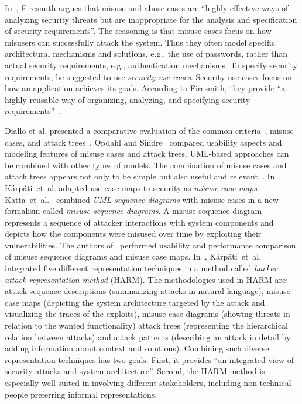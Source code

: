 \documentclass[a4paper]{article}
\begin{document}
In~\cite{Fire}, Firesmith argues that  misuse and abuse cases are ``highly
effective ways of analyzing security threats but are inappropriate for  the
analysis and specification of security requirements''. The reasoning is  that
misuse cases focus on how misusers can successfully attack the system.  Thus
they often model specific architectural mechanisms and solutions, e.g.,  the use
of passwords, rather than actual security requirements, e.g.,  authentication
mechanisms. To specify security requirements, he suggested to  use
\emph{security use cases}. Security use cases focus on how an application 
achieves its goals. According to Firesmith, they provide ``a highly-reusable 
way of organizing, analyzing, and specifying security 
requirements''~\cite{Fire}. 

Diallo et al. presented a comparative  evaluation of the common
criteria~\cite{CC},  misuse cases, and attack  trees~\cite{DiRoSiAlRi}. Opdahl
and Sindre~\cite{OpSi} compared usability aspects and  modeling features of
misuse cases and attack trees.   UML-based approaches can be combined with other
types of models.  The combination of misuse cases and attack trees  appears not
only to be simple but also useful and  relevant~\cite{ToJeRo,MeToJe}. 
In~\cite{KaSiOp}, K\'{a}rp\'{a}ti~et~al.  adapted use case maps to security as
\emph{misuse case maps}. Katta~et~al.~\cite{Katta2010} combined \emph{UML
sequence diagrams} with misuse cases in  a new formalism called \emph{misuse
sequence diagrams}.  A misuse sequence diagram represents a sequence of attacker
interactions with  system components and depicts how the components were misused
over time by  exploiting their vulnerabilities. The authors of~\cite{Katta2010}
performed  usability and performance comparison of misuse sequence diagrams and
misuse case  maps. In~\cite{KaSiOp2},  K\'{a}rp\'{a}ti~et~al. integrated five
different representation techniques  in a method called \emph{hacker attack
representation method} (HARM).  The methodologies used in HARM are: attack
sequence descriptions (summarizing  attacks in natural language), misuse case
maps (depicting the system  architecture targeted by the attack and visualizing
the traces of the  exploits), misuse case diagrams (showing threats in relation
to the wanted  functionality) attack trees (representing the hierarchical
relation between  attacks) and attack patterns (describing an attack in detail
by adding  information about context and solutions). Combining such diverse
representation  techniques has two goals. First, it provides ``an integrated
view of security attacks  and system architecture''. Second, the HARM method is
especially well  suited in involving different stakeholders, including
non-technical people  preferring informal representations. 
\end{document}
